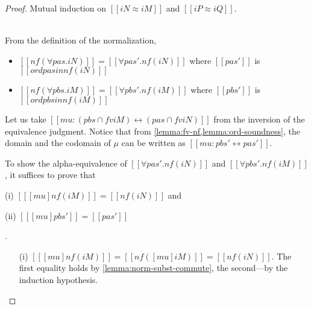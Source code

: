 \begin{proof}
  Mutual induction on $[[iN ≈ iM]]$ and $[[iP ≈ iQ]]$.
  \begin{caseof}
  \item {\nameref{\ottdruleEOneForallLabel}} \label{case:ord-completeness:forall} \\

    From the definition of the normalization,
    \begin{itemize}
      \item $[[nf(∀pas.iN)]] = [[∀pas'.nf(iN)]]$ where $[[pas']]$ is $[[ord {pas} in nf(iN)]]$
      \item $[[nf(∀pbs.iM)]] = [[∀pbs'.nf(iM)]]$ where $[[pbs']]$ is $[[ord {pbs} in nf(iM)]]$
    \end{itemize}
    Let us take $[[mu : ({pbs} ∩ fv iM) ↔ ({pas} ∩ fv iN)]]$ from the
    inversion of the equivalence judgment. Notice that from
    \cref{lemma:fv-nf,lemma:ord-soundness}, the domain and the codomain of $\mu$ can be written
    as $[[mu : {pbs'} ↔ {pas'}]]$.
    
    To show the alpha-equivalence of $[[∀pas'.nf(iN)]]$ and $[[∀pbs'.nf(iM)]]$,
    it suffices to prove that
    \begin{enumerate*}
    \item[(i)] $[[ [mu] nf(iM) ]] = [[nf(iN)]]$ and \newline
    \item[(ii)] $[[ [mu]pbs' ]] = [[pas']]$
    \end{enumerate*}.
    
    \begin{enumerate}
    \item[(i)] $[[ [mu] nf(iM) ]] = [[nf([mu]iM)]] = [[nf(iN)]]$.
      The first equality holds by \cref{lemma:norm-subst-commute}, the second---by the induction hypothesis.


\end{enumerate}
\end{caseof}
\end{proof}
